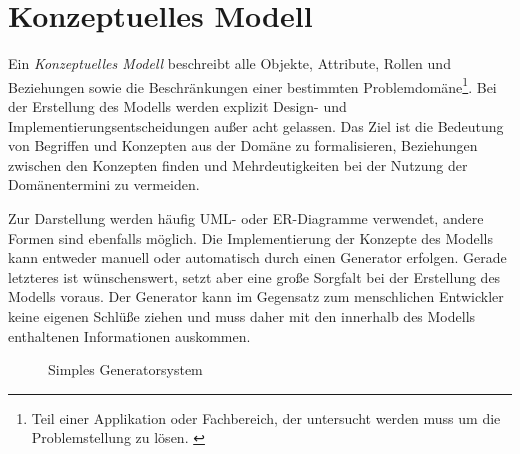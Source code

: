 \section{Konzeptuelles Modell}
\label{sec:conceptual_model}

\begin{thesisDefinition}
Ein \emph{Konzeptuelles Modell} beschreibt alle Objekte, Attribute, Rollen und Beziehungen sowie die Beschränkungen einer bestimmten Problemdomäne\footnote{Teil einer Applikation oder Fachbereich, der untersucht werden muss um die Problemstellung zu lösen. \cite{wiki:problemdomain}}.
Bei der Erstellung des Modells werden explizit Design- und Implementierungsentscheidungen außer acht gelassen. 
Das Ziel ist die Bedeutung von Begriffen und Konzepten aus der Domäne zu formalisieren, Beziehungen zwischen den Konzepten finden und Mehrdeutigkeiten bei der Nutzung der Domänentermini zu vermeiden.
\end{thesisDefinition}

Zur Darstellung werden häufig UML- oder ER-Diagramme verwendet, andere Formen sind ebenfalls möglich.
Die Implementierung der Konzepte des Modells kann entweder manuell oder automatisch durch einen Generator erfolgen. Gerade letzteres ist wünschenswert, setzt aber eine große Sorgfalt bei der Erstellung des Modells voraus. Der Generator kann im Gegensatz zum menschlichen Entwickler keine eigenen Schlüße ziehen und muss daher mit den innerhalb des Modells enthaltenen Informationen auskommen.


\begin{figure}[tb]
    \centering
    \caption{Simples Generatorsystem}
    \label{fig:generatorsystem}
\end{figure}

